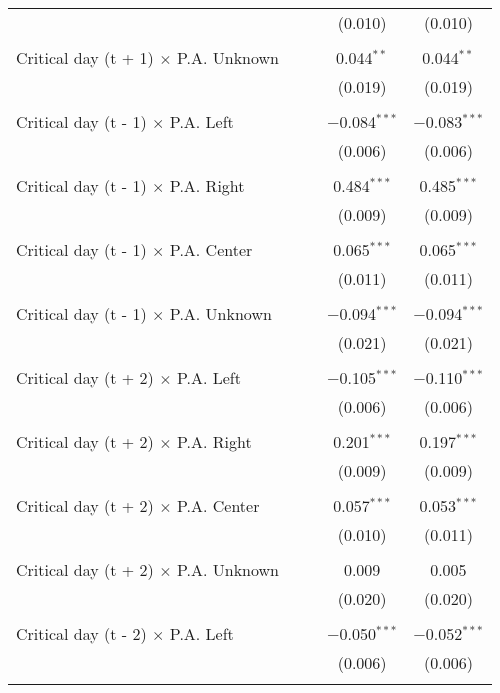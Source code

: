 \documentclass[
]{article}
\begin{document}
\begin{table}[!htbp]
{\begin{tabular}{@{\extracolsep{5pt}}lcccc}
  &  &  & (0.010) & (0.010) \\ 
  & & & & \\ 
 Critical day (t + 1) $\times$ P.A. Unknown &  &  & 0.044$^{**}$ & 0.044$^{**}$ \\ 
  &  &  & (0.019) & (0.019) \\ 
  & & & & \\ 
 Critical day (t - 1) $\times$ P.A. Left &  &  & $-$0.084$^{***}$ & $-$0.083$^{***}$ \\ 
  &  &  & (0.006) & (0.006) \\ 
  & & & & \\ 
 Critical day (t - 1) $\times$ P.A. Right &  &  & 0.484$^{***}$ & 0.485$^{***}$ \\ 
  &  &  & (0.009) & (0.009) \\ 
  & & & & \\ 
 Critical day (t - 1) $\times$ P.A. Center &  &  & 0.065$^{***}$ & 0.065$^{***}$ \\ 
  &  &  & (0.011) & (0.011) \\ 
  & & & & \\ 
 Critical day (t - 1) $\times$ P.A. Unknown &  &  & $-$0.094$^{***}$ & $-$0.094$^{***}$ \\ 
  &  &  & (0.021) & (0.021) \\ 
  & & & & \\ 
 Critical day (t + 2) $\times$ P.A. Left &  &  & $-$0.105$^{***}$ & $-$0.110$^{***}$ \\ 
  &  &  & (0.006) & (0.006) \\ 
  & & & & \\ 
 Critical day (t + 2) $\times$ P.A. Right &  &  & 0.201$^{***}$ & 0.197$^{***}$ \\ 
  &  &  & (0.009) & (0.009) \\ 
  & & & & \\ 
 Critical day (t + 2) $\times$ P.A. Center &  &  & 0.057$^{***}$ & 0.053$^{***}$ \\ 
  &  &  & (0.010) & (0.011) \\ 
  & & & & \\ 
 Critical day (t + 2) $\times$ P.A. Unknown &  &  & 0.009 & 0.005 \\ 
  &  &  & (0.020) & (0.020) \\ 
  & & & & \\ 
 Critical day (t - 2) $\times$ P.A. Left &  &  & $-$0.050$^{***}$ & $-$0.052$^{***}$ \\ 
  &  &  & (0.006) & (0.006) \\ 
  & & & & \\ 

\end{tabular}}
\end{table}
\end{document}
